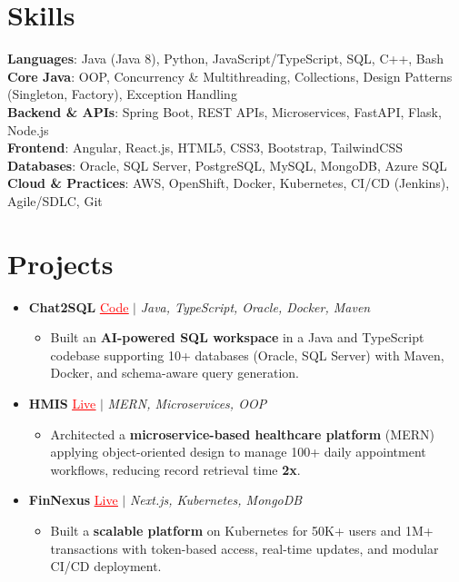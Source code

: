 \documentclass[letterpaper,10pt]{article}
\newcommand{\resumeItem}[1]{\item\small{{#1 \vspace{-2pt}}}}
\newcommand{\resumeProjectHeading}[1]{\item \small #1 \vspace{-2pt}}
\newcommand{\resumeSubHeadingListStart}{\begin{itemize}[leftmargin=0.0in, label={}]}
\newcommand{\resumeSubHeadingListEnd}{\end{itemize}}
\newcommand{\resumeProjItemListStart}{\begin{itemize}[leftmargin=0.15in,label=\textbullet,itemsep=0pt,topsep=0pt,parsep=0pt,partopsep=0pt]}
\newcommand{\resumeProjItemListEnd}{\end{itemize}\vspace{-4pt}}
\begin{document}
\section{Skills}
\begin{itemize}[leftmargin=0.15in, label={}]
\small{\item{
\textbf{Languages}: Java (Java 8), Python, JavaScript/TypeScript, SQL, C++, Bash \\
\textbf{Core Java}: OOP, Concurrency \& Multithreading, Collections, Design Patterns (Singleton, Factory), Exception Handling \\
\textbf{Backend \& APIs}: Spring Boot, REST APIs, Microservices, FastAPI, Flask, Node.js \\
\textbf{Frontend}: Angular, React.js, HTML5, CSS3, Bootstrap, TailwindCSS \\
\textbf{Databases}: Oracle, SQL Server, PostgreSQL, MySQL, MongoDB, Azure SQL \\
\textbf{Cloud \& Practices}: AWS, OpenShift, Docker, Kubernetes, CI/CD (Jenkins), Agile/SDLC, Git
}}
\end{itemize}
\vspace{-6pt}
\section{Projects}
\resumeSubHeadingListStart
\vspace{-2pt}
\resumeProjectHeading{\textbf{Chat2SQL} {\href{https://github.com/SAHAJ-BHADJA/Chat2SQL}{\textcolor{red}{\underline{Code}}}} $|$ \emph{Java, TypeScript, Oracle, Docker, Maven}}
\resumeProjItemListStart
\resumeItem{Built an \textbf{AI-powered SQL workspace} in a Java and TypeScript codebase supporting 10+ databases (Oracle, SQL Server) with Maven, Docker, and schema-aware query generation.}
\resumeProjItemListEnd
\vspace{3pt}
\resumeProjectHeading{\textbf{HMIS} {\href{https://hims-rouge.vercel.app/}{\textcolor{red}{\underline{Live}}}} $|$ \emph{MERN, Microservices, OOP}}
\resumeProjItemListStart
\resumeItem{Architected a \textbf{microservice-based healthcare platform} (MERN) applying object-oriented design to manage 100+ daily appointment workflows, reducing record retrieval time \textbf{2x}.}
\resumeProjItemListEnd
\vspace{3pt}
\resumeProjectHeading{\textbf{FinNexus} {\href{https://fin-nexus.vercel.app/}{\textcolor{red}{\underline{Live}}}} $|$ \emph{Next.js, Kubernetes, MongoDB}}
\resumeProjItemListStart
\resumeItem{Built a \textbf{scalable platform} on Kubernetes for 50K+ users and 1M+ transactions with token-based access, real-time updates, and modular CI/CD deployment.}
\resumeProjItemListEnd
\resumeSubHeadingListEnd
\end{document}
